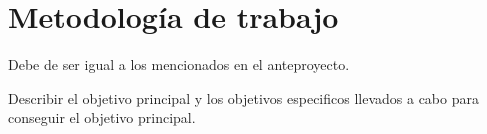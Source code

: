 \chapter{Metodología de trabajo}
\label{ch:metodologia}

Debe de ser igual a los mencionados en el anteproyecto.

Describir el objetivo principal y los objetivos especificos llevados a cabo para conseguir el objetivo principal.